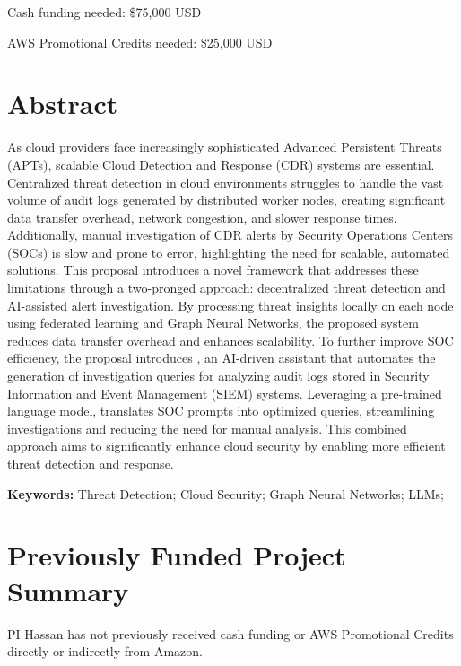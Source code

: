 \documentclass[11pt,pdftex]{article}
\begin{document}
\thispagestyle{firststyle}
\vspace{-3mm}

Cash funding needed: \$75,000 USD

AWS Promotional Credits needed: \$25,000 USD

  \section*{Abstract}

  As cloud providers face increasingly sophisticated Advanced Persistent Threats (APTs), scalable Cloud Detection and Response (CDR) systems are essential. Centralized threat detection in cloud environments struggles to handle the vast volume of audit logs generated by distributed worker nodes, creating significant data transfer overhead, network congestion, and slower response times. Additionally, manual investigation of CDR alerts by Security Operations Centers (SOCs) is slow and prone to error, highlighting the need for scalable, automated solutions. This proposal introduces a novel framework that addresses these limitations through a two-pronged approach: decentralized threat detection and AI-assisted alert investigation. By processing threat insights locally on each node using federated learning and Graph Neural Networks, the proposed \Sysa system reduces data transfer overhead and enhances scalability. To further improve SOC efficiency, the proposal introduces \Sysb, an AI-driven assistant that automates the generation of investigation queries for analyzing audit logs stored in Security Information and Event Management (SIEM) systems. Leveraging a pre-trained language model, \Sysb translates SOC prompts into optimized queries, streamlining investigations and reducing the need for manual analysis. This combined approach aims to significantly enhance cloud security by enabling more efficient threat detection and response.



\smallskip
{\bf Keywords:} Threat Detection; Cloud Security; Graph Neural Networks; LLMs;


\thispagestyle{firststyle}
\setcounter{page}{1}


\pagestyle{plain}
\newpage

\setcounter{page}{1}
{\scriptsize
\printbibliography
}

\newpage


\setcounter{page}{1}
\newpage
\section*{Previously Funded Project Summary}
PI Hassan has not previously received cash funding or AWS Promotional Credits directly or indirectly from Amazon.
\end{document}
